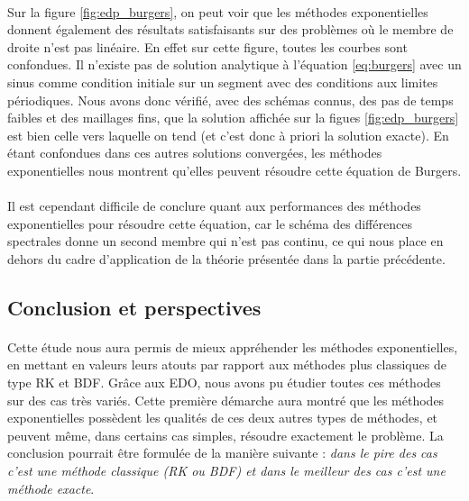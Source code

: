         \paragraph{}
        Sur la figure \ref{fig:edp_burgers}, on peut voir que les méthodes exponentielles donnent également des résultats satisfaisants sur des problèmes où le membre de droite n'est pas linéaire. En effet sur cette figure, toutes les courbes sont confondues. Il n'existe pas de solution analytique à l'équation \ref{eq:burgers} avec un sinus comme condition initiale sur un segment avec des conditions aux limites périodiques. Nous avons donc vérifié, avec des schémas connus, des pas de temps faibles et des maillages fins, que la solution affichée sur la figues \ref{fig:edp_burgers} est bien celle vers laquelle on tend (et c'est donc à priori la solution exacte). En étant confondues dans ces autres solutions convergées, les méthodes exponentielles nous montrent qu'elles peuvent résoudre cette équation de Burgers.

        \paragraph{}
        Il est cependant difficile de conclure quant aux performances des méthodes exponentielles pour résoudre cette équation, car le schéma des différences spectrales donne un second membre qui n'est pas continu, ce qui nous place en dehors du cadre d'application de la théorie présentée dans la partie précédente.


\subsection{Conclusion et perspectives}

    \paragraph{}
    Cette étude nous aura permis de mieux appréhender les méthodes exponentielles, en mettant en valeurs leurs atouts par rapport aux méthodes plus classiques de type RK et BDF. Grâce aux EDO, nous avons pu étudier toutes ces méthodes sur des cas très variés. Cette première démarche aura montré que les méthodes exponentielles possèdent les qualités de ces deux autres types de méthodes, et peuvent même, dans certains cas simples, résoudre exactement le problème. La conclusion pourrait être formulée de la manière suivante : \emph{dans le pire des cas c'est une méthode classique (RK ou BDF) et dans le meilleur des cas c'est une méthode exacte}.

